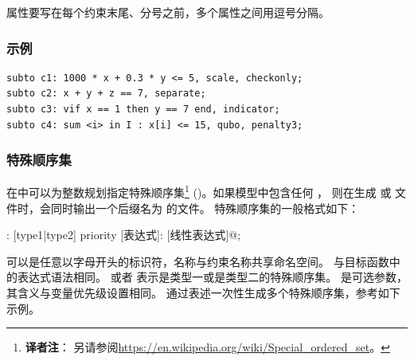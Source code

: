 \noindent
属性要写在每个约束末尾、分号之前，多个属性之间用逗号分隔。

\subsubsection{示例}
{\small
\begin{verbatim}
subto c1: 1000 * x + 0.3 * y <= 5, scale, checkonly;
subto c2: x + y + z == 7, separate;
subto c3: vif x == 1 then y == 7 end, indicator;
subto c4: sum <i> in I : x[i] <= 15, qubo, penalty3;
\end{verbatim}
}


\subsubsection{特殊顺序集}
在\zimpl 中可以为整数规划指定特殊顺序集\footnote{\textbf{译者注}：
  另请参阅\url{https://en.wikipedia.org/wiki/Special_ordered_set}。
} (\sos)。如果模型中包含任何 \sos，
则在生成  或  文件时，会同时输出一个后缀名为
 的文件。
特殊顺序集的一般格式如下：

\smallskip
\verb@sos [名称]: [type1|type2] priority [表达式]: [线性表达式]@;

\smallskip
\noindent 
{} 可以是任意以字母开头的标识符，\sos 名称与约束名称共享命名空间。
 与目标函数中的表达式语法相同。
 或者   表示是类型一或是类型二的特殊顺序集。
 是可选参数，其含义与变量优先级设置相同。
通过表述一次性生成多个特殊顺序集，参考如下示例。

